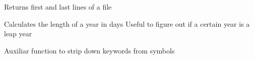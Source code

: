 \documentclass[a4paper,10pt,oneside]{sphinxmanual}
\begin{document}

\begin{fulllineitems}
\label{pymicra.algs:pymicra.algs.auxiliar.first_last}
Returns first and last lines of a file

\end{fulllineitems}


\begin{fulllineitems}
\label{pymicra.algs:pymicra.algs.auxiliar.lenYear}
Calculates the length of a year in days
Useful to figure out if a certain year is a leap year

\end{fulllineitems}


\begin{fulllineitems}
\label{pymicra.algs:pymicra.algs.auxiliar.stripDown}
Auxiliar function to strip down keywords from symbols

\end{fulllineitems}

\end{document}
